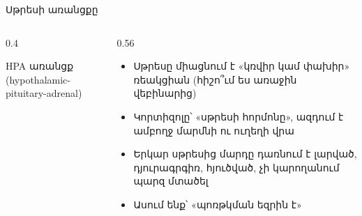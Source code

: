 \begin{frame}{Սթրեսի առանցքը}
  \begin{columns}[c]
    \begin{column}{0.4\textwidth}
      \centering
      \par\smallskip
      {\scriptsize HPA առանցք (hypothalamic-pituitary-adrenal)}
    \end{column}
    \begin{column}{0.56\textwidth}
      \begin{itemize}
        \item Սթրեսը միացնում է «կռվիր կամ փախիր» ռեակցիան (հիշո՞ւմ ես առաջին վեբինարից)
        \item<2-> Կորտիզոլը՝ «սթրեսի հորմոնը», ազդում է ամբողջ մարմնի ու ուղեղի վրա
        \item<3-> Երկար սթրեսից մարդը դառնում է լարված, դյուրագրգիռ, հյուծված, չի կարողանում պարզ մտածել
        \item<4-> Ասում ենք՝ «պոռթկման եզրին է»
      \end{itemize}
    \end{column}
  \end{columns}
\end{frame}

